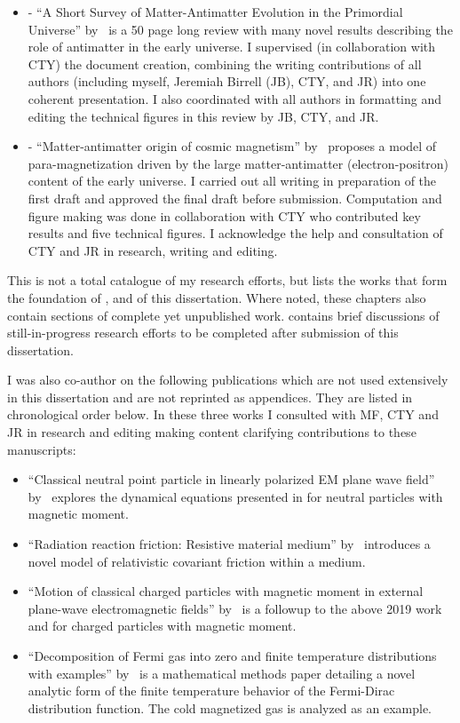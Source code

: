\begin{itemize}
    \item {} - ``A Short Survey of Matter-Antimatter Evolution in the Primordial Universe'' by~\citet*{Rafelski:2023emw} is a 50 page long review with many novel results describing the role of antimatter in the early universe. I supervised (in collaboration with CTY) the document creation, combining the writing contributions of all authors (including myself, Jeremiah Birrell\orc{\orcE} (JB), CTY, and JR) into one coherent presentation. I also coordinated with all authors in formatting and editing the technical figures in this review by JB, CTY, and JR.
    \item {} - ``Matter-antimatter origin of cosmic magnetism'' by~\citet*{Steinmetz:2023nsc} proposes a model of para-magnetization driven by the large matter-antimatter (electron-positron) content of the early universe. I carried out all writing in preparation of the first draft and approved the final draft before submission. Computation and figure making was done in collaboration with CTY who contributed key results and five technical figures. I acknowledge the help and consultation of CTY and JR in research, writing and editing.
\end{itemize}

This is not a total catalogue of my research efforts, but lists the works that form the foundation of ,  and  of this dissertation. Where noted, these chapters also contain sections of complete yet unpublished work.  contains brief discussions of still-in-progress research efforts to be completed after submission of this dissertation.

I was also co-author on the following publications which are not used extensively in this dissertation and are not reprinted as appendices. They are listed in chronological order below. In these three works I consulted with MF, CTY and JR in research and editing making content clarifying contributions to these manuscripts:
\begin{itemize}
    \item ``Classical neutral point particle in linearly polarized EM plane wave field'' by~\citet*{Formanek:2019cga} explores the dynamical equations presented in  for neutral particles with magnetic moment.
    \item ``Radiation reaction friction: Resistive material medium'' by~\citet*{Formanek:2020zwc} introduces a novel model of relativistic covariant friction within a medium.
    \item ``Motion of classical charged particles with magnetic moment in external plane-wave electromagnetic fields'' by~\citet*{Formanek:2021mcp} is a followup to the above 2019 work and  for charged particles with magnetic moment.
    \item ``Decomposition of Fermi gas into zero and finite temperature distributions with examples'' by~\citet*{Yang:2023aaa} is a mathematical methods paper detailing a novel analytic form of the finite temperature behavior of the Fermi-Dirac distribution function. The cold magnetized gas is analyzed as an example.
\end{itemize}


